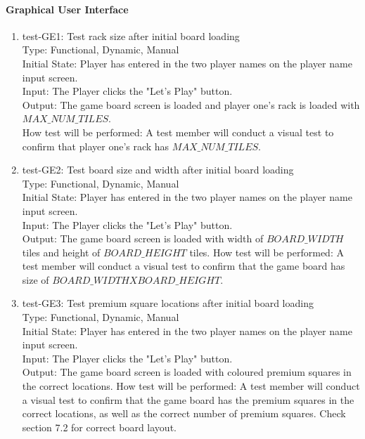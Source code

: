 \documentclass[12pt, titlepage]{article}
\begin{document}
\paragraph{Graphical User Interface}
\begin{enumerate}
    \item{test-GE1: Test rack size after initial board loading\\} %
    Type: Functional, Dynamic, Manual\\
    Initial State: Player has entered in the two player names on the player name input screen. \\
    Input: The Player clicks the "Let's Play" button.\\
    Output: The game board screen is loaded and player one's rack is loaded with $MAX\_NUM\_TILES$.\\
    How test will be performed: A test member will conduct a visual test to confirm that player one's rack has $MAX\_NUM\_TILES$.\\
    
    \item{test-GE2: Test board size and width after initial board loading\\} %
    Type: Functional, Dynamic, Manual\\
    Initial State: Player has entered in the two player names on the player name input screen. \\
    Input: The Player clicks the "Let's Play" button.\\
    Output: The game board screen is loaded with width of $BOARD\_WIDTH$ tiles and height of $BOARD\_HEIGHT$ tiles.
    How test will be performed: A test member will conduct a visual test to confirm that the game board has size of $BOARD\_WIDTHXBOARD\_HEIGHT$.\\
    
    \item{test-GE3: Test premium square locations after initial board loading\\} %
    Type: Functional, Dynamic, Manual\\
    Initial State: Player has entered in the two player names on the player name input screen. \\
    Input: The Player clicks the "Let's Play" button.\\
    Output: The game board screen is loaded with coloured premium squares in the correct locations.
    How test will be performed: A test member will conduct a visual test to confirm that the game board has the premium squares in the correct locations, as well as the correct number of premium squares. Check section 7.2 for correct board layout.\\
    

\end{enumerate}
\end{document}

